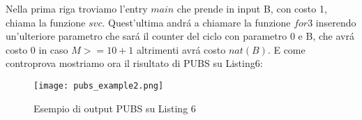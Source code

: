 \documentclass[../../main.tex]{subfiles}
\begin{document}
Nella prima riga troviamo l'entry $main$ che prende in input B, con costo 1, chiama la funzione $svc$.
Quest'ultima andrá a chiamare la funzione $for3$ inserendo un'ulteriore parametro che sará il counter del ciclo con parametro 0 e B, che avrá costo 0 in caso $M >= 10 + 1$ altrimenti avrá costo $nat(B)$.
E come controprova mostriamo ora il risultato di PUBS su Listing6:
\begin{figure}[H]
    \centering
    \texttt{[image: pubs\_example2.png]}
    \caption{Esempio di output PUBS su Listing 6}
\end{figure}
\end{document}
